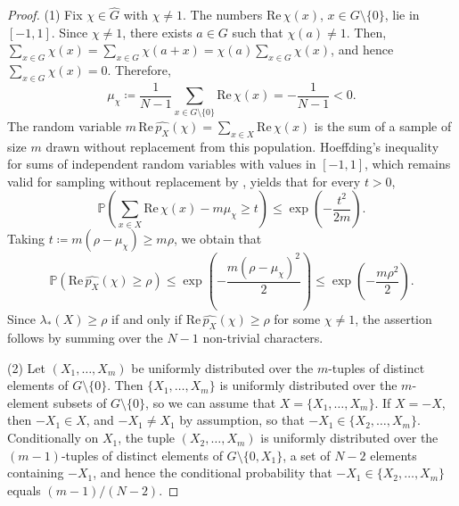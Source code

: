 \documentclass[a4paper, reqno, 11pt]{amsart}
\theoremstyle{definition}
\begin{document}
\begin{proof}
(1)
Fix $\chi \in \widehat{G}$ with $\chi \ne 1$. 
The numbers $\mathrm{Re}\, \chi(x)$, $x \in G \setminus \{0\}$, lie in $[-1,1]$. 
Since $\chi \ne 1$, there exists $a \in G$ such that $\chi(a) \ne 1$. 
Then, $\sum_{x \in G} \chi(x) = \sum_{x \in G} \chi(a+x) = \chi(a) \sum_{x \in G} \chi(x)$, and hence $\sum_{x \in G} \chi(x) = 0$. 
Therefore, 
\[ \mu_{\chi} \coloneqq \frac{1}{N-1} \sum_{x \in G \setminus \{0\}} \mathrm{Re}\, \chi(x) = -\frac{1}{N-1} < 0. \]
The random variable $m\, \mathrm{Re}\, \widehat{p_{X}}(\chi) = \sum_{x \in X} \mathrm{Re}\, \chi(x)$ is the sum of a sample of size $m$ drawn without replacement from this population.
Hoeffding's inequality \cite[Theorem 2]{Hoeffding1963} for sums of independent random variables with values in $[-1,1]$,
which remains valid for sampling without replacement by \cite[Section 6]{Hoeffding1963}, yields that for every $t > 0$,
\[ \mathbb{P}\left( \sum_{x \in X} \mathrm{Re}\, \chi(x) - m \mu_{\chi} \ge t \right) \le \exp\left(-\frac{t^{2}}{2m}\right). \]
Taking $t \coloneqq m\left(\rho - \mu_{\chi}\right) \ge m\rho$, we obtain that 
\[ \mathbb{P}\left( \mathrm{Re}\, \widehat{p_{X}}(\chi) \ge \rho \right) \le \exp\left(-\frac{m\left(\rho - \mu_{\chi}\right)^{2}}{2}\right) \le \exp\left(-\frac{m\rho^{2}}{2}\right). \]
Since $\lambda_{*}(X) \ge \rho$ if and only if $\mathrm{Re}\, \widehat{p_{X}}(\chi) \ge \rho$ for some $\chi \ne 1$,
the assertion follows by summing over the $N-1$ non-trivial characters.

(2)
Let $(X_{1}, \dots, X_{m})$ be uniformly distributed over the $m$-tuples of distinct elements of $G \setminus \{0\}$.
Then $\{X_{1}, \dots, X_{m}\}$ is uniformly distributed over the $m$-element subsets of $G \setminus \{0\}$, so we can assume that $X = \{X_{1}, \dots, X_{m}\}$.
If $X = -X$, then $-X_{1} \in X$, and $-X_{1} \ne X_{1}$ by assumption, so that $-X_{1} \in \{X_{2}, \dots, X_{m}\}$.
Conditionally on $X_{1}$, the tuple $(X_{2}, \dots, X_{m})$ is uniformly distributed over the $(m-1)$-tuples of distinct elements of $G \setminus \{0, X_{1}\}$,
a set of $N-2$ elements containing $-X_{1}$, and hence the conditional probability that $-X_{1} \in \{X_{2}, \dots, X_{m}\}$ equals $(m-1)/(N-2)$.
\end{proof}
\end{document}
